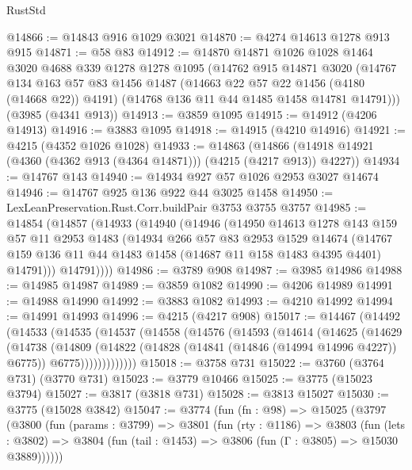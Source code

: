 \begin{lexlean}{RustStd}
\begin{coremodule}
@14866 := @14843 @916 @1029 @3021
@14870 := @4274 @14613 @1278 @913 @915
@14871 := @58 @83
@14912 := @14870
    @14871
    @1026
    @1028
    @1464
    @3020
    @4688
    @339
    @1278
    @1278
    @1095
    (@14762
      @915
      @14871
      @3020
      (@14767
        @134
        @163
        @57
        @83
        @1456
        @1487
        (@14663 @22 @57 @22 @1456 (@4180 (@14668 @22)) @4191)
        (@14768 @136 @11 @44 @1485 @1458 @14781 @14791)))
    (@3985 (@4341 @913))
@14913 := @3859 @1095
@14915 := @14912 (@4206 @14913)
@14916 := @3883 @1095
@14918 := @14915 (@4210 @14916)
@14921 := @4215 (@4352 @1026 @1028)
@14933 := @14863
    (@14866 (@14918 @14921 (@4360 (@4362 @913 (@4364 @14871))) (@4215 (@4217 @913)) @4227))
@14934 := @14767 @143
@14940 := @14934 @927 @57 @1026 @2953 @3027 @14674
@14946 := @14767 @925 @136 @922 @44 @3025 @1458
@14950 := LexLeanPreservation.Rust.Corr.buildPair @3753 @3755 @3757
@14985 := @14854
    (@14857
      (@14933
        (@14940
          (@14946
            (@14950
              @14613
              @1278
              @143
              @159
              @57
              @11
              @2953
              @1483
              (@14934
                @266
                @57
                @83
                @2953
                @1529
                @14674
                (@14767 @159 @136 @11 @44 @1483 @1458 (@14687 @11 @158 @1483 @4395 @4401) @14791)))
            @14791))))
@14986 := @3789 @908
@14987 := @3985 @14986
@14988 := @14985 @14987
@14989 := @3859 @1082
@14990 := @4206 @14989
@14991 := @14988 @14990
@14992 := @3883 @1082
@14993 := @4210 @14992
@14994 := @14991 @14993
@14996 := @4215 (@4217 @908)
@15017 := @14467
    (@14492
      (@14533
        (@14535
          (@14537
            (@14558
              (@14576
                (@14593
                  (@14614
                    (@14625
                      (@14629
                        (@14738
                          (@14809
                            (@14822
                              (@14828 (@14841 (@14846 (@14994 @14996 @4227)) @6775))
                              @6775)))))))))))))
@15018 := @3758 @731
@15022 := @3760 (@3764 @731) (@3770 @731)
@15023 := @3779 @10466
@15025 := @3775 (@15023 @3794)
@15027 := @3817 (@3818 @731)
@15028 := @3813 @15027
@15030 := @3775 (@15028 @3842)
@15047 := @3774
    (fun (fn : @98) =>
    @15025
      (@3797
        (@3800
          (fun (params : @3799) =>
          @3801
            (fun (rty : @1186) =>
            @3803
              (fun (lets : @3802) =>
              @3804 (fun (tail : @1453) => @3806 (fun (Γ : @3805) => @15030 @3889))))))

\end{coremodule}
\end{lexlean}
